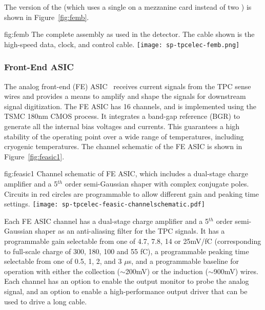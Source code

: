 The  version of the  (which uses a single  on a mezzanine card instead of two  ) is shown in Figure~\ref{fig:femb}.

\begin{dunefigure}
{fig:femb}
{The complete  assembly as used in the  detector. The cable shown is the high-speed data, clock, and control cable.}
\texttt{[image: sp-tpcelec-femb.png]}
\end{dunefigure}

\subsubsection{Front-End ASIC}
\label{sec:fdsp-tpcelec-design-femb-fe}

The analog front-end (FE) ASIC~\cite{DeGeronimo:2011zz} receives current signals from the TPC sense wires and provides a means to amplify and shape the signals for downstream signal digitization.  The FE ASIC has 16 channels, and is implemented using the TSMC 180nm CMOS process. It integrates a band-gap reference (BGR) to generate all the internal bias voltages and currents. This guarantees a high stability of the operating point over a wide range of temperatures, including cryogenic temperatures. The channel schematic of the FE ASIC is shown in Figure~\ref{fig:feasic1}. 

\begin{dunefigure}
{fig:feasic1}
{Channel schematic of FE ASIC, which includes a dual-stage charge amplifier and a 5$^{th}$ order semi-Gaussian shaper with complex conjugate poles. Circuits in red circles are programmable to allow different gain and peaking time settings.}
\texttt{[image: sp-tpcelec-feasic-channelschematic.pdf]}
\end{dunefigure}

Each FE ASIC channel has a dual-stage charge amplifier and a 5$^{th}$ order semi-Gaussian shaper as an anti-aliasing filter for the TPC signals. It has a programmable gain selectable from one of 4.7, 7.8, 14 or 25mV/fC (corresponding to full-scale charge of 300, 180, 100 and 55 fC), a programmable peaking time selectable from one of 0.5, 1, 2, and 3 $\mu$s, and a programmable baseline for operation with either the collection ($\sim$200mV) or the induction ($\sim$900mV) wires. Each channel has an option to enable the output monitor to probe the analog signal, and an option to enable a high-performance output driver that can be used to drive a long cable. 

